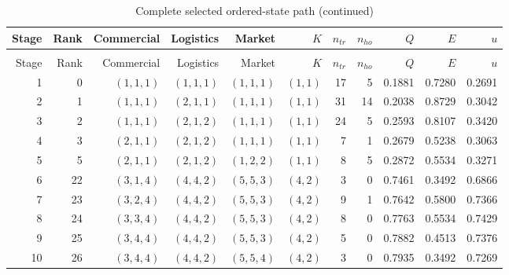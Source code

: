 \begingroup\small\setlength{\tabcolsep}{3pt}
\begin{longtable}{@{}rrrrrrrrrrr@{}}
\caption{Complete selected ordered-state path}\label{tab:s9}\\
\toprule
Stage & Rank & Commercial & Logistics & Market & $K$ & $n_{tr}$ & $n_{ho}$ & $Q$ & $E$ & $u$\\
\midrule
\endfirsthead
\caption[]{Complete selected ordered-state path (continued)}\\
\toprule
Stage & Rank & Commercial & Logistics & Market & $K$ & $n_{tr}$ & $n_{ho}$ & $Q$ & $E$ & $u$\\
\midrule
\endhead
1 & 0 & $(1,1,1)$ & $(1,1,1)$ & $(1,1,1)$ & $(1,1)$ & 17 & 5 & 0.1881 & 0.7280 & 0.2691\\
2 & 1 & $(1,1,1)$ & $(2,1,1)$ & $(1,1,1)$ & $(1,1)$ & 31 & 14 & 0.2038 & 0.8729 & 0.3042\\
3 & 2 & $(1,1,1)$ & $(2,1,2)$ & $(1,1,1)$ & $(1,1)$ & 24 & 5 & 0.2593 & 0.8107 & 0.3420\\
4 & 3 & $(2,1,1)$ & $(2,1,2)$ & $(1,1,1)$ & $(1,1)$ & 7 & 1 & 0.2679 & 0.5238 & 0.3063\\
5 & 5 & $(2,1,1)$ & $(2,1,2)$ & $(1,2,2)$ & $(1,1)$ & 8 & 5 & 0.2872 & 0.5534 & 0.3271\\
6 & 22 & $(3,1,4)$ & $(4,4,2)$ & $(5,5,3)$ & $(4,2)$ & 3 & 0 & 0.7461 & 0.3492 & 0.6866\\
7 & 23 & $(3,2,4)$ & $(4,4,2)$ & $(5,5,3)$ & $(4,2)$ & 9 & 1 & 0.7642 & 0.5800 & 0.7366\\
8 & 24 & $(3,3,4)$ & $(4,4,2)$ & $(5,5,3)$ & $(4,2)$ & 8 & 0 & 0.7763 & 0.5534 & 0.7429\\
9 & 25 & $(3,4,4)$ & $(4,4,2)$ & $(5,5,3)$ & $(4,2)$ & 5 & 0 & 0.7882 & 0.4513 & 0.7376\\
10 & 26 & $(3,4,4)$ & $(4,4,2)$ & $(5,5,4)$ & $(4,2)$ & 3 & 0 & 0.7935 & 0.3492 & 0.7269\\
\bottomrule
\end{longtable}
\endgroup
